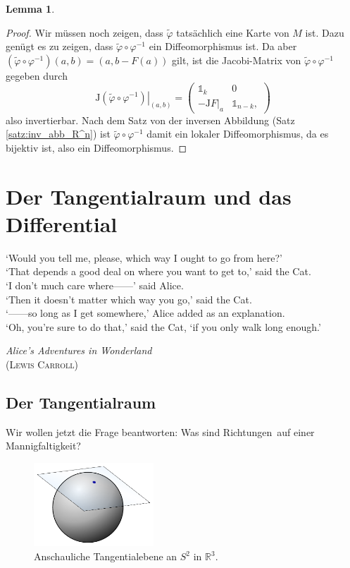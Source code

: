 \documentclass[a4paper]{scrbook}
\numberwithin{equation}{chapter}
\newcommand{\R}{\mathbb{R}}
\theoremstyle{definition}
\newtheorem{lemma}[defn]{Lemma}
\begin{document}
\begin{lemma}
\begin{proof}
		Wir müssen noch zeigen, dass $\tilde\varphi$ tatsächlich eine Karte von $M$ ist. Dazu genügt es zu zeigen, dass $\tilde\varphi \circ \varphi^{-1}$ ein Diffeomorphismus ist. Da aber $(\tilde\varphi \circ \varphi^{-1})(a,b) = (a, b - F(a))$ gilt, ist die Jacobi-Matrix von $\tilde\varphi \circ \varphi^{-1}$ gegeben durch
		\[\left.\mathrm{J}(\tilde\varphi \circ \varphi^{-1})\right|_{(a,b)} = \begin{pmatrix}
			\mathds{1}_k & 0 \\
			- \left.\mathrm{J}F\right|_a & \mathds{1}_{n-k},
		\end{pmatrix}\]
		also invertierbar. Nach dem Satz von der inversen Abbildung (Satz \ref{satz:inv_abb_R^n}) ist $\tilde\varphi \circ \varphi^{-1}$ damit ein lokaler Diffeomorphismus, da es bijektiv ist, also ein Diffeomorphismus.
	\end{proof}
\end{lemma}


\chapter{Der Tangentialraum und das Differential}
\epigraph{`Would you tell me, please, which way I ought to go from here?'\\
	`That depends a good deal on where you want to get to,' said the Cat.\\
	`I don't much care where------' said Alice.\\
	`Then it doesn't matter which way you go,' said the Cat.\\
	`------so long as I get somewhere,' Alice added as an explanation.\\
	`Oh, you're sure to do that,' said the Cat, `if you only walk long enough.'}
{\emph{Alice's Adventures in Wonderland}\\(\textsc{Lewis Carroll})}

\section{Der Tangentialraum}
Wir wollen jetzt die Frage beantworten: Was sind \glqq Richtungen\grqq\ auf einer Mannigfaltigkeit?

\begin{figure} \label{fig:tngt_plane}
	\centering
	\includegraphics[width=0.4\textwidth]{Image_Tangent-plane}
	\caption{Anschauliche Tangentialebene an $S^2$ in $\R^3$.}
\end{figure}
\end{document}
